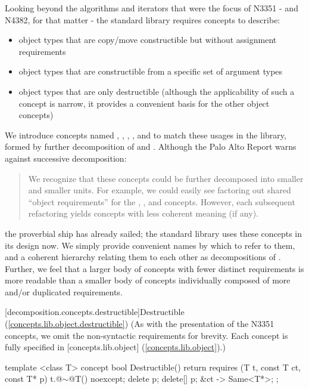 Looking beyond the algorithms and iterators that were the focus of N3351 - and N4382, for that
matter - the standard library requires concepts to describe:
\begin{itemize}
\item object types that are copy/move constructible but without assignment requirements
\item object types that are constructible from a specific set of argument types
\item object types that are only destructible (although the applicability of such a concept is
narrow, it provides a convenient basis for the other object concepts)
\end{itemize}
We introduce concepts named , ,
, , and  to match these usages
in the library, formed by further decomposition of  and . Although
the Palo Alto Report warns against successive decomposition:
\begin{quote}
We recognize that these concepts could be further decomposed into smaller and smaller units.
For example, we could easily see factoring out shared ``object requirements'' for the
, , and  concepts. However, each subsequent
refactoring yields concepts with less coherent meaning (if any).
\end{quote}
the proverbial ship has already sailed; the standard library uses these concepts in its design
now. We simply provide convenient names by which to refer to them, and a coherent hierarchy
relating them to each other as decompositions of . Further, we feel that a larger
body of concepts with fewer distinct requirements is more readable than a smaller body of concepts
individually composed of more and/or duplicated requirements.

[decomposition.concepts.destructible]{Destructible (\ref{concepts.lib.object.destructible})}
(As with the presentation of the N3351 concepts, we omit the non-syntactic requirements for
brevity. Each concept is fully specified in [concepts.lib.object] (\ref{concepts.lib.object}).)

\begin{codeblock}
template <class T>
concept bool Destructible() {
  return requires (T t, const T ct, const T* p) {
    { t.@$\sim$@T() } noexcept;
    delete p;
    delete[] p;
    { &ct } -> Same<T*>;
  };
}
\end{codeblock}

